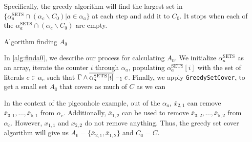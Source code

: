 Specifically, the greedy algorithm will find the largest set in $\{\alpha_a^\mathrm{SETS} \cap (\alpha_c \backslash C_0) | a \in \alpha_a \}$ at each step and add it to $C_0$. It stops when each of the $\alpha_a^\mathrm{SETS} \cap (\alpha_c \backslash C_0)$ are empty.


\begin{algorithm}
    \caption{Algorithm finding $A_0$}\label{alg:finda0}
    \SetAlgoNoLine
\end{algorithm}

In \autoref{alg:finda0}, we describe our process for calculating $A_0$. 
We initialize $\alpha_a^\mathrm{SETS}$ as an array, iterate the counter
$i$ through $\alpha_a$, populating $\alpha_a^\mathrm{SETS}[i]$ with the set of literals
$c \in \alpha_c$ such that $\Gamma \land \overline{\alpha_a^\mathrm{SETS}[i]} \vdash_1 c$. Finally, we apply
\texttt{GreedySetCover}, to get a small set $A_0$ that covers as much of $C$ as we can

In the context of the pigeonhole example, out of the $\alpha_a$,
$\overline{x}_{2, 1}$ can remove $\overline{x}_{3, 1}, \ldots, \overline{x}_{5,
1}$ from $\alpha_c$. Additionally, $\overline{x}_{1, 2}$ can be used to remove
$\overline{x}_{3, 2}, \ldots, \overline{x}_{5, 2}$ from $\alpha_c$. However,
$x_{1, 1}$ and $x_{2, 2}$ do not remove anything. Thus, the greedy set cover
algorithm will give us $A_0 = \{\overline{x}_{2, 1}, \overline{x}_{1, 2}\}$ and
$C_0 = C$.




